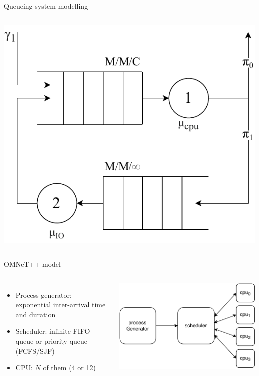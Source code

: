 \documentclass[aspectratio=169,xcolor=dvipsnames]{beamer}
\begin{document}
\begin{frame}{Queueing system modelling}
\begin{columns}[c]
        \includegraphics[width=\textwidth]{files/queue_schema.pdf}
    \end{columns}
\end{frame}


\begin{frame}{OMNeT++ model}
    \begin{columns}[c] %

    \begin{itemize}
        \item Process generator: exponential inter-arrival time and duration
        \item Scheduler: infinite FIFO queue or priority queue (FCFS/SJF)
        \item CPU: $N$ of them (4 or 12)
    \end{itemize}

    \includegraphics[width=\textwidth]{files/Computer.pdf} %
\end{columns}
    
\end{frame}
\end{document}
